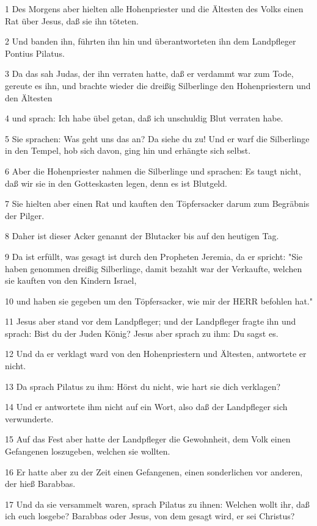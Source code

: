 \par 1 Des Morgens aber hielten alle Hohenpriester und die Ältesten des Volks einen Rat über Jesus, daß sie ihn töteten.
\par 2 Und banden ihn, führten ihn hin und überantworteten ihn dem Landpfleger Pontius Pilatus.
\par 3 Da das sah Judas, der ihn verraten hatte, daß er verdammt war zum Tode, gereute es ihn, und brachte wieder die dreißig Silberlinge den Hohenpriestern und den Ältesten
\par 4 und sprach: Ich habe übel getan, daß ich unschuldig Blut verraten habe.
\par 5 Sie sprachen: Was geht uns das an? Da siehe du zu! Und er warf die Silberlinge in den Tempel, hob sich davon, ging hin und erhängte sich selbst.
\par 6 Aber die Hohenpriester nahmen die Silberlinge und sprachen: Es taugt nicht, daß wir sie in den Gotteskasten legen, denn es ist Blutgeld.
\par 7 Sie hielten aber einen Rat und kauften den Töpfersacker darum zum Begräbnis der Pilger.
\par 8 Daher ist dieser Acker genannt der Blutacker bis auf den heutigen Tag.
\par 9 Da ist erfüllt, was gesagt ist durch den Propheten Jeremia, da er spricht: "Sie haben genommen dreißig Silberlinge, damit bezahlt war der Verkaufte, welchen sie kauften von den Kindern Israel,
\par 10 und haben sie gegeben um den Töpfersacker, wie mir der HERR befohlen hat."
\par 11 Jesus aber stand vor dem Landpfleger; und der Landpfleger fragte ihn und sprach: Bist du der Juden König? Jesus aber sprach zu ihm: Du sagst es.
\par 12 Und da er verklagt ward von den Hohenpriestern und Ältesten, antwortete er nicht.
\par 13 Da sprach Pilatus zu ihm: Hörst du nicht, wie hart sie dich verklagen?
\par 14 Und er antwortete ihm nicht auf ein Wort, also daß der Landpfleger sich verwunderte.
\par 15 Auf das Fest aber hatte der Landpfleger die Gewohnheit, dem Volk einen Gefangenen loszugeben, welchen sie wollten.
\par 16 Er hatte aber zu der Zeit einen Gefangenen, einen sonderlichen vor anderen, der hieß Barabbas.
\par 17 Und da sie versammelt waren, sprach Pilatus zu ihnen: Welchen wollt ihr, daß ich euch losgebe? Barabbas oder Jesus, von dem gesagt wird, er sei Christus?
